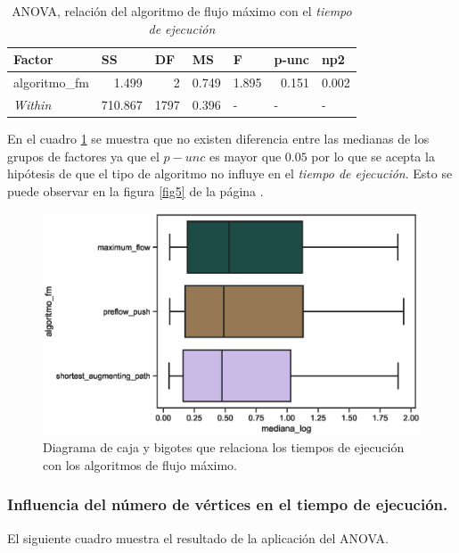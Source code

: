 \documentclass{article}
\begin{document}
\begin{table}[htbp]
  \centering
  \caption{ANOVA, relación del algoritmo de flujo máximo con el \textit{tiempo de ejecución}}
    \begin{tabular}{lrrrlll}
    \toprule
    \textbf{Factor} & \multicolumn{1}{l}{\textbf{SS}} & \multicolumn{1}{l}{\textbf{DF}} & \multicolumn{1}{l}{\textbf{MS}} & \textbf{F} & \textbf{p-unc} & \textbf{np2} \\
    \midrule
    algoritmo\_fm & 1.499 & 2     & 0.749 & \multicolumn{1}{r}{1.895} & \multicolumn{1}{r}{0.151} & \multicolumn{1}{r}{0.002} \\
    \textit{Within} & 710.867 & 1797  & 0.396 & -     & -     & - \\
    \bottomrule
    \end{tabular}%
  \label{tab:t3}%
\end{table}%
En el cuadro \ref{tab:t3} se muestra que no existen diferencia entre las medianas de los grupos de factores ya que el $p-unc$ es mayor que $0.05$ por lo que se acepta la hipótesis de que el tipo de algoritmo no influye en el \textit{tiempo de ejecución}. Esto se puede observar en la figura \ref{fig5} de la página \pageref{fig5}. 
\begin{center}
\begin{figure}[htbp]
\includegraphics[scale=0.6]{boxplotalgoritmofm.eps}
\caption{Diagrama de caja y bigotes que relaciona los tiempos de ejecución con los algoritmos de flujo máximo.}
\label{fig4}
\end{figure}
\end{center}
\newpage

\subsubsection{Influencia del número de vértices en el tiempo de ejecución.}
El siguiente cuadro muestra el resultado de la aplicación del ANOVA.
\end{document}
